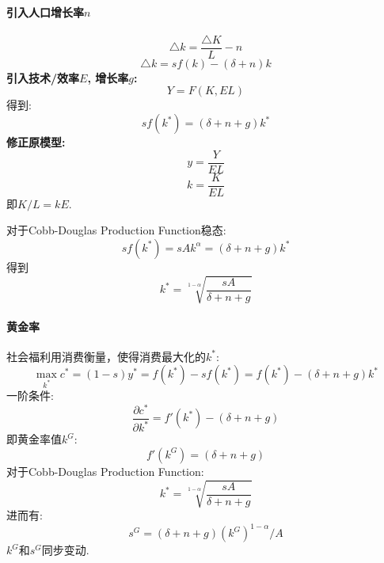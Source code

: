 \documentclass[UTF8, onecolumn, a4paper, 12pt]{article}
\begin{document}
\paragraph{引入人口增长率$n$}
$$\triangle k = \frac{\triangle K}{L} - n$$
$$\triangle k = sf(k) - (\delta + n)k$$
\textbf{引入技术/效率$E$, 增长率$g$:} $$Y = F(K, EL)$$
得到:
$$sf(k^*) = (\delta + n + g)k^*$$
\textbf{修正原模型:}
$$y = \frac{Y}{EL}$$
$$k = \frac{K}{EL}$$
即$K/L = kE$.

对于Cobb-Douglas Production Function稳态:
$$sf(k^*) = sAk^{\alpha} = (\delta + n + g)k^*$$
得到
$$k^* = \sqrt[1-\alpha]{\frac{sA}{\delta + n + g}}$$
\paragraph{黄金率}
社会福利用消费衡量，使得消费最大化的$k^*$:
$$\max_{k^*}c^* = (1-s)y^* = f(k^*) - sf(k^*) = f(k^*) - (\delta + n + g)k^*$$
一阶条件:
$$\frac{\partial c^*}{\partial k^*} = f'(k^*) - (\delta + n + g)$$
即黄金率值$k^G$:
$$f'(k^G) = (\delta + n + g)$$
对于Cobb-Douglas Production Function:
$$k^* = \sqrt[1-\alpha]{\frac{sA}{\delta + n + g}}$$
进而有:
$$s^{G} = (\delta + n + g)(k^G)^{1-\alpha} / A$$
$k^G$和$s^G$同步变动.
\end{document}
